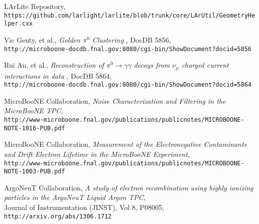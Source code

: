 \documentclass[a4paper]{article}
\begin{document}
\begin{thebibliography}{9}
  LArLite Repository, \\
  \texttt{https://github.com/larlight/larlite/blob/trunk/core/LArUtil/GeometryHelper.cxx}
  
   Vic Genty, et al., \emph{Golden $\pi^0$ Clustering }, DocDB 5856,\\
   \texttt{http://microboone-docdb.fnal.gov:8080/cgi-bin/ShowDocument?docid=5856}
   
  Rui An, et al., \emph{Reconstruction of $\pi^0 \rightarrow \gamma\gamma$ decays from $\nu_\mu$ charged current interactions in data }, DocDB 5864,\\
   \texttt{http://microboone-docdb.fnal.gov:8080/cgi-bin/ShowDocument?docid=5864}
   
  MicroBooNE Collaboration, \emph{Noise Characterization and Filtering in the MicroBooNE TPC},\\
  \texttt{http://www-microboone.fnal.gov/publications/publicnotes/MICROBOONE-NOTE-1016-PUB.pdf}

  MicroBooNE Collaboration, \emph{Measurement of the Electronegative Contaminants and Drift Electron Lifetime in the MicroBooNE Experiment},\\
  \texttt{http://www-microboone.fnal.gov/publications/publicnotes/MICROBOONE-NOTE-1003-PUB.pdf}

  ArgoNeuT Collaboration, \emph{A study of electron recombination using highly ionizing particles in the ArgoNeuT Liquid Argon TPC},\\
  Journal of Instrumentation (JINST), Vol 8, P08005, \texttt{http://arxiv.org/abs/1306.1712}


\end{thebibliography}
\end{document}
